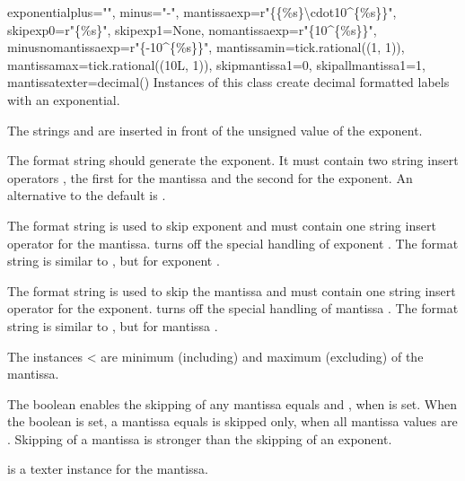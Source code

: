\begin{classdesc}{exponential}{plus="", minus="-",
                               mantissaexp=r"\{\{\%s\}\textbackslash cdot10\textasciicircum\{\%s\}\}",
                               skipexp0=r"\{\%s\}",
                               skipexp1=None,
                               nomantissaexp=r"\{10\textasciicircum\{\%s\}\}",
                               minusnomantissaexp=r"\{-10\textasciicircum\{\%s\}\}",
                               mantissamin=tick.rational((1, 1)), mantissamax=tick.rational((10L, 1)),
                               skipmantissa1=0, skipallmantissa1=1,
                               mantissatexter=decimal()}
  Instances of this class create decimal formatted labels with an
  exponential.

  The strings  and  are inserted in front of the
  unsigned value of the exponent.

  The format string  should generate the exponent. It
  must contain two string insert operators , the first for
  the mantissa and the second for the exponent. An alternative to the
  default is .

  The format string  is used to skip exponent  and must
  contain one string insert operator  for the mantissa.
   turns off the special handling of exponent .
  The format string  is similar to , but
  for exponent .

  The format string  is used to skip the mantissa
   and must contain one string insert operator  for
  the exponent.  turns off the special handling of mantissa
  . The format string  is similar
  to , but for mantissa .

  The  instances \textless
   are minimum (including) and maximum (excluding) of
  the mantissa.

  The boolean  enables the skipping of any mantissa
  equals  and , when  is set.
  When the boolean  is set, a mantissa equals
   is skipped only, when all mantissa values are .
  Skipping of a mantissa is stronger than the skipping of an exponent.

   is a texter instance for the mantissa.
\end{classdesc}

